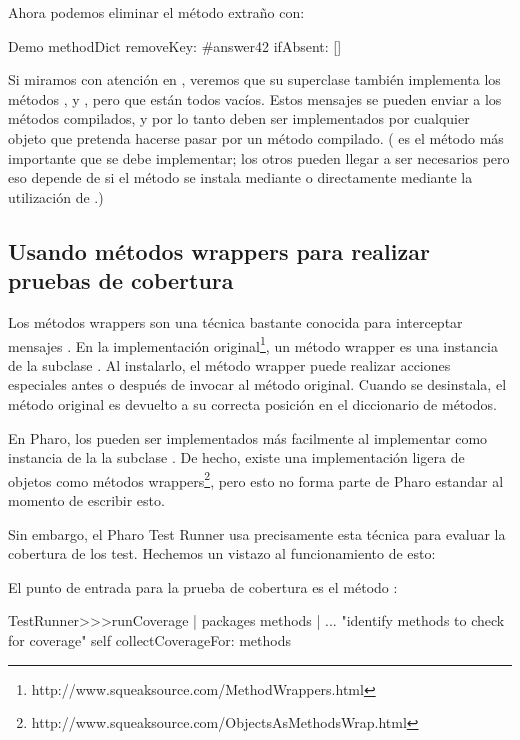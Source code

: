 \documentclass[a4paper,10pt,twoside]{book}
\begin{document}
Ahora podemos eliminar el m\'etodo extraño con:
\begin{code}{}
Demo methodDict removeKey: #answer42 ifAbsent: []
\end{code}

Si miramos con atenci\'on en , veremos que
su superclase tambi\'en implementa los m\'etodos ,
 y , pero que est\'an todos vac\'ios.
Estos mensajes se pueden enviar a los m\'etodos compilados, y por lo
tanto deben ser implementados por cualquier objeto que pretenda
hacerse pasar por un m\'etodo compilado.  ( es el m\'etodo
m\'as importante que se debe implementar; los otros pueden llegar a ser
necesarios pero eso depende de si el m\'etodo se instala mediante
 o directamente mediante
la utilizaci\'on de .)


\subsection{Usando m\'etodos wrappers para realizar pruebas de cobertura}

Los m\'etodos wrappers son una t\'ecnica bastante conocida para interceptar mensajes \cite{Bran98a}. En la implementaci\'on original\footnote{http://www.squeaksource.com/MethodWrappers.html}, un m\'etodo wrapper es una instancia de la subclase . Al instalarlo, el m\'etodo wrapper puede realizar acciones especiales antes o despu\'es de invocar al m\'etodo original. Cuando se desinstala, el m\'etodo original es devuelto a su correcta posici\'on en el diccionario de m\'etodos.

En Pharo, los  pueden ser implementados m\'as facilmente al implementar  como instancia de la la subclase . De hecho, existe una implementaci\'on ligera de objetos como m\'etodos wrappers\footnote{http://www.squeaksource.com/ObjectsAsMethodsWrap.html}, pero esto no forma parte de Pharo estandar al momento de escribir esto.

Sin embargo, el Pharo Test Runner usa precisamente esta t\'ecnica para evaluar la cobertura de los test. Hechemos un vistazo al funcionamiento de esto:

El punto de entrada para la prueba de cobertura es el m\'etodo :
\begin{code}{}
TestRunner>>>runCoverage
        | packages methods |
        ... "identify methods to check for coverage"
        self collectCoverageFor: methods
\end{code}
\end{document}
